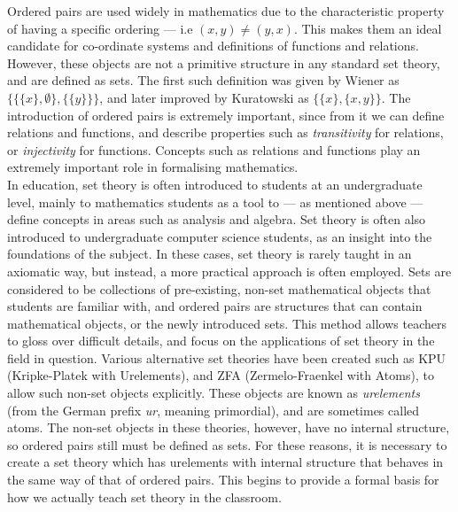 \documentclass[11pt]{report}
\theoremstyle{definition}
\theoremstyle{theorem}
\theoremstyle{lemma}
\begin{document}
Ordered pairs are used widely in mathematics due to the characteristic property of having a specific ordering --- i.e $(x,y) \neq (y,x)$.
This makes them an ideal candidate for co-ordinate systems and definitions of functions and relations.
However, these objects are not a primitive structure in any standard set theory, and are defined as sets.
The first such definition was given by Wiener as $\{\{\{x\},\emptyset\},\{\{y\}\}\}$, and later improved by Kuratowski as $\{\{x\},\{x,y\}\}$.
The introduction of ordered pairs is extremely important, since from it we can define relations and functions, and describe properties such as \emph{transitivity} for relations, or \emph{injectivity} for functions.
Concepts such as relations and functions play an extremely important role in formalising mathematics.\\

In education, set theory is often introduced to students at an undergraduate level, mainly to mathematics students as a tool to --- as mentioned above --- define concepts in areas such as analysis and algebra.
Set theory is often also introduced to undergraduate computer science students, as an insight into the foundations of the subject.
In these cases, set theory is rarely taught in an axiomatic way, but instead, a more practical approach is often employed. 
Sets are considered to be collections of pre-existing, non-set mathematical objects that students are familiar with, and ordered pairs are structures that can contain mathematical objects, or the newly introduced sets.  
This method allows teachers to gloss over difficult details, and focus on the applications of set theory in the field in question.
Various alternative set theories have been created such as KPU (Kripke-Platek with Urelements), and ZFA (Zermelo-Fraenkel with Atoms), to allow such non-set objects explicitly.
These objects are known as \emph{urelements} (from the German prefix \emph{ur}, meaning primordial), and are sometimes called atoms.
The non-set objects in these theories, however, have no internal structure, so ordered pairs still must be defined as sets.
For these reasons, it is necessary to create a set theory which has urelements with internal structure that behaves in the same way of that of ordered pairs. 
This begins to provide a formal basis for how we actually teach set theory in the classroom. \\
\end{document}
